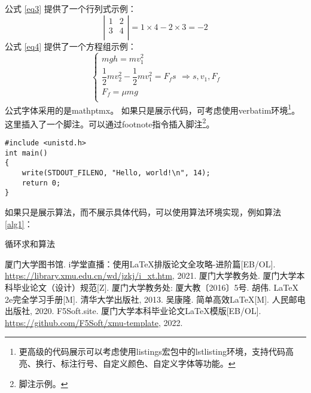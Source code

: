 \documentclass{xmu}
\begin{document}
公式 \ref{eq3} 提供了一个行列式示例：
\begin{equation}\label{eq3}
    \left|\begin{array}{cc}
        1 & 2 \\
        3 & 4 \\
    \end{array}\right|=1\times4-2\times3=-2
\end{equation}
公式 \ref{eq4} 提供了一个方程组示例：
\begin{equation}\label{eq4}
    \begin{cases}
        mgh=mv_1^2                         \\
        \dfrac12mv_2^2-\dfrac12mv_1^2=F_fs \\
        F_f=\mu mg                         \\
    \end{cases} \Rightarrow s,v_1,F_f
\end{equation}
公式字体采用的是mathptmx。
如果只是展示代码，可考虑使用verbatim环境\footnote{更高级的代码展示可以考虑使用listings宏包中的lstlisting环境，支持代码高亮、换行、标注行号、自定义颜色、自定义字体等功能。}。
这里插入了一个脚注。可以通过footnote指令插入脚注\footnote{脚注示例。}。
\begin{verbatim}
#include <unistd.h>
int main()
{
    write(STDOUT_FILENO, "Hello, world!\n", 14);
    return 0;
}
\end{verbatim}
如果只是展示算法，而不展示具体代码，可以使用算法环境实现，例如算法 \ref{alg1}：
\begin{algorithm}[!htb]
    \caption{循环求和算法}\label{alg1}
\end{algorithm}


\begin{reference}

    \begin{thebibliography}{5}
         厦门大学图书馆. i学堂直播：使用LaTeX排版论文全攻略-进阶篇[EB/OL]. \url{https://library.xmu.edu.cn/wd/jzkj/i_xt.htm}, 2021.
         厦门大学教务处. 厦门大学本科毕业论文（设计）规范[Z]. 厦门大学教务处: 厦大教〔2016〕5号.
         胡伟. LaTeX 2e完全学习手册[M]. 清华大学出版社, 2013.
         吴康隆. 简单高效LaTeX[M]. 人民邮电出版社, 2020.
         F5Soft.site. 厦门大学本科毕业论文LaTeX模版[EB/OL]. \url{https://github.com/F5Soft/xmu-template}, 2022.
    \end{thebibliography}
\end{reference}
\end{document}
